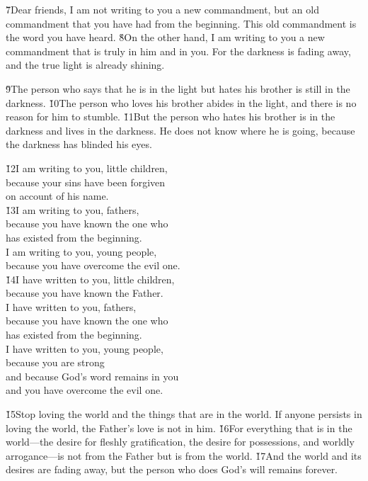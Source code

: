 \v{7}Dear friends, I am not writing to you a new commandment, but an old commandment that you have had from the beginning. This old commandment is the word you have heard. \v{8}On the other hand, I am writing to you a new commandment that is truly in him and in you. For the darkness is fading away, and the true light is already shining.

\v{9}The person who says that he is in the light but hates his brother is still in the darkness. \v{10}The person who loves his brother abides in the light, and there is no reason for him to stumble. \v{11}But the person who hates his brother is in the darkness and lives in the darkness. He does not know where he is going, because the darkness has blinded his eyes.

\begin{poetry}
\poeml \v{12}I am writing to you, little children, \\
\poemll    because your sins have been forgiven \\
\poemlll       on account of his name. \\
\poeml \v{13}I am writing to you, fathers, \\
\poemll    because you have known the one who \\
\poemlll       has existed from the beginning. \\
\poeml I am writing to you, young people, \\
\poemll    because you have overcome the evil one. \\
\poeml \v{14}I have written to you, little children, \\
\poemll    because you have known the Father. \\
\poeml I have written to you, fathers, \\
\poemll    because you have known the one who \\
\poemlll       has existed from the beginning. \\
\poeml I have written to you, young people, \\
\poemll    because you are strong \\
\poemll    and because God's word remains in you \\
\poemlll       and you have overcome the evil one.
\end{poetry}

\v{15}Stop loving the world and the things that are in the world. If anyone persists in loving the world, the Father's love is not in him. \v{16}For everything that is in the world---the desire for fleshly gratification, the desire for possessions, and worldly arrogance---is not from the Father but is from the world. \v{17}And the world and its desires are fading away, but the person who does God's will remains forever.

